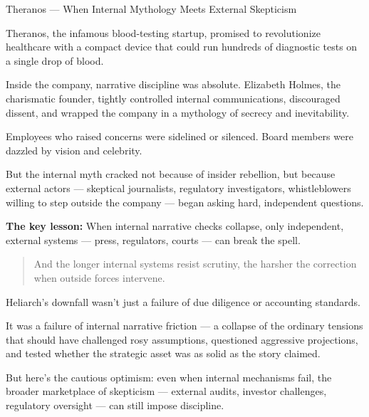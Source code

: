 \medskip

\begin{HistoricalSidebar}{Theranos --- When Internal Mythology Meets External Skepticism}

Theranos, the infamous blood-testing startup, promised to revolutionize healthcare with a compact device that could run hundreds of diagnostic tests on a single drop of blood.

\medskip

Inside the company, narrative discipline was absolute.  
Elizabeth Holmes, the charismatic founder, tightly controlled internal communications, discouraged dissent, and wrapped the company in a mythology of secrecy and inevitability.

\medskip

Employees who raised concerns were sidelined or silenced.  
Board members were dazzled by vision and celebrity.

\medskip

But the internal myth cracked not because of insider rebellion, but because external actors — skeptical journalists, regulatory investigators, whistleblowers willing to step outside the company — began asking hard, independent questions.

\medskip

\textbf{The key lesson:}  
When internal narrative checks collapse, only independent, external systems — press, regulators, courts — can break the spell.

\begin{quote}
    And the longer internal systems resist scrutiny, the harsher the correction when outside forces intervene.
\end{quote}

\end{HistoricalSidebar}

\medskip

Heliarch’s downfall wasn’t just a failure of due diligence or accounting standards.

It was a failure of internal narrative friction —  
a collapse of the ordinary tensions that should have challenged rosy assumptions, questioned aggressive projections, and tested whether the strategic asset was as solid as the story claimed.

\medskip

But here’s the cautious optimism:
even when internal mechanisms fail,  
the broader marketplace of skepticism — external audits, investor challenges, regulatory oversight — can still impose discipline.

